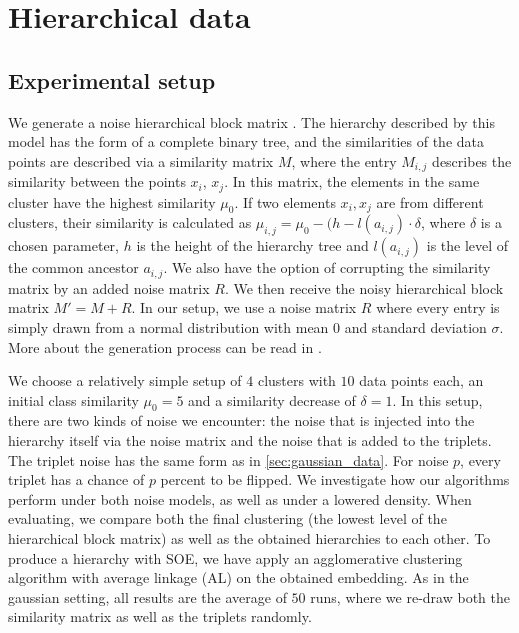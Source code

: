 \section{Hierarchical data}\label{sec:hierarchical_data}
\subsection{Experimental setup}\label{sec:hierarchical_setup}
We generate a noise hierarchical block matrix \citep{balakrishnanNoiseThresholdsSpectral2011}.
The hierarchy described by this model has the form of a complete binary tree, and the similarities of the data points are described via a similarity matrix $M$, 
where the entry $M_{i,j}$ describes the similarity between the points $x_i$, $x_j$.
In this matrix, the elements in the same cluster have the highest similarity $\mu_0$. If two elements $x_i, x_j$ are from different clusters,
their similarity is calculated as $\mu_{i,j} = \mu_0 - (h - l(a_{i,j}) \cdot \delta$, where $\delta$ is a chosen parameter, $h$ is the height of the hierarchy tree and $l(a_{i,j})$
is the level of the common ancestor $a_{i,j}$.
We also have the option of corrupting the similarity matrix by 
an added noise matrix $R$. We then receive the noisy hierarchical block matrix $M' = M + R$. 
In our setup, we use a noise matrix $R$ where every entry is simply drawn from a normal distribution with mean $0$ and standard deviation $\sigma$.
More about the generation process can be read in \cite{ghoshdastidarFoundationsComparisonBasedHierarchical2019}.

We choose a relatively simple setup of $4$ clusters with $10$ data points each, an initial class similarity $\mu_0 = 5$ and a similarity decrease of $\delta = 1$.
In this setup, there are two kinds of noise we encounter: the noise that is injected into the hierarchy itself via the noise matrix and the noise that is added to the triplets.
The triplet noise has the same form as in \autoref{sec:gaussian_data}. For noise $p$, every triplet has a chance of $p$ percent to be flipped. 
We investigate how our algorithms perform under both noise models, as well as under a lowered density.  
When evaluating, we compare both the final clustering (the lowest level of the hierarchical block matrix) as well as the obtained hierarchies to each other. 
To produce a hierarchy with SOE, we have apply an agglomerative clustering algorithm with average linkage (AL) on the obtained embedding.
As in the gaussian setting, all results are the average of $50$ runs, where we re-draw both the similarity matrix as well as the triplets randomly. 

